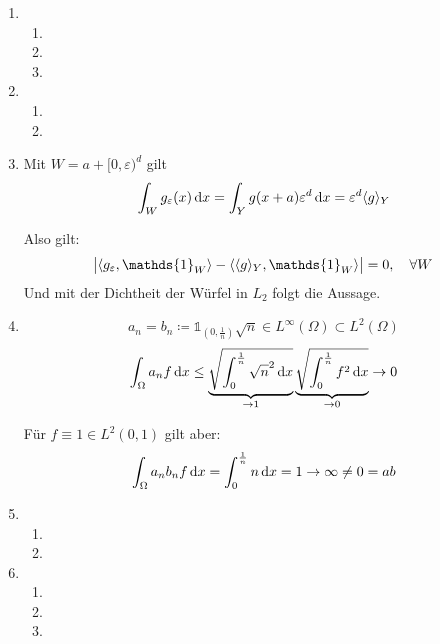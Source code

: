 \documentclass[a4paper,11pt]{scrartcl}
\newcommand*{\eps}{\varepsilon}
\newcommand*{\dx}{\dif{}x}
\newcommand*{\indn}{\mathds{1}_{\left(0, \frac{1}{n}\right)}}
\newcommand*{\iW}{\mathds{1}_W}
\begin{document}
\begin{enumerate}[label*=\textbf{11.\arabic*.}]

\item
  \begin{enumerate}
  \item
  \item
  \item
  \end{enumerate}


\item
  \begin{enumerate}
  \item
  \item
  \end{enumerate}


\item
  Mit $W = a + [0, \eps)^d$ gilt
  \[ \int_W g_\eps(x) \dx  = \int_Y g(x + a) \eps^d \dx = \eps^d \langle g \rangle_Y \]

  Also gilt:
  \[\abs{\langle g_\eps, \iW \rangle - \langle \langle g \rangle_Y, \iW
      \rangle} = 0, \quad \forall W\]
  Und mit der Dichtheit der Würfel in $L_2$ folgt die Aussage.

\item
  \[a_n = b_n \coloneqq \indn \sqrt{n} \in L^\infty(\Omega) \subset L^2(\Omega)\]
  \[\int_\Omega a_n f \dx \leq
    \underbrace{\sqrt{\int_0^{\frac{1}{n}} \sqrt{n}^2\dx}}_{\rightarrow 1}
    \underbrace{\sqrt{\int_0^{\frac{1}{n}} f^2 \dx}}_{\rightarrow 0} \rightarrow 0 \]

Für $f \equiv 1 \in L^2(0, 1)$ gilt aber:
\[\int_\Omega a_n b_n f \dx = \int_0^{\frac{1}{n}} n \dx = 1 \rightarrow \infty \neq 0 =
  a b\]


\item
  \begin{enumerate}
  \item
  \item
  \end{enumerate}


\item
  \begin{enumerate}
  \item
  \item
  \item
  \end{enumerate}

\end{enumerate}
\end{document}
